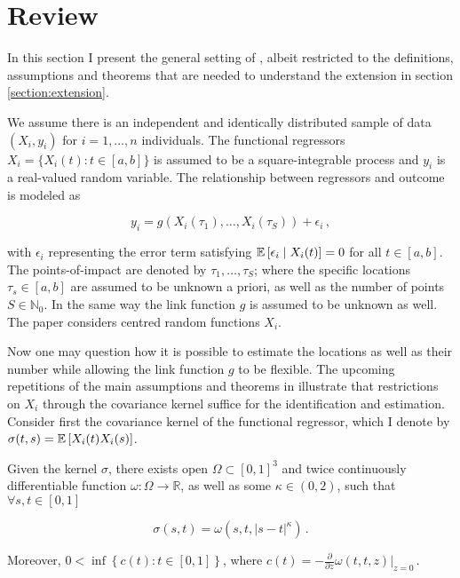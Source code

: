 \section{Review}
\label{section:review}

In this section I present the general setting of \cite{Kneip2020}, albeit restricted to
the definitions, assumptions and theorems that are needed to understand the extension in
section \ref{section:extension}.

We assume there is an independent and identically distributed sample of data $(X_i,
y_i)$ for $i=1,\dots,n$ individuals. The functional regressors $X_i = \{ X_i(t) : t \in
[a, b] \}$ is assumed to be a square-integrable process and $y_i$ is a real-valued
random variable. The relationship between regressors and outcome is modeled as

\[
    y_i = g \left( X_i(\tau_1), \dots, X_i(\tau_S) \right) + \epsilon_i \,,
\]

with $\epsilon_i$ representing the error term satisfying $\mathbb{E}\left[\epsilon_i \mid
X_i(t)\right] = 0$ for all $t \in [a, b]$. The points-of-impact are denoted by $\tau_1, \dots,
\tau_S$; where the specific locations $\tau_s \in [a, b]$ are assumed to be unknown a
priori, as well as the number of points $S \in \mathbb{N}_0$. In the same way the link
function $g$ is assumed to be unknown as well. The paper considers centred random
functions $X_i$.

Now one may question how it is possible to estimate the locations as well as their
number while allowing the link function $g$ to be flexible. The upcoming repetitions of
the main assumptions and theorems in \cite{Kneip2020} illustrate that restrictions on
$X_i$ through the covariance kernel suffice for the identification and estimation.
Consider first the covariance kernel of the functional regressor, which I denote by
$\sigma(t, s) = \mathbb{E}\left[X_i(t) X_i(s)\right]$.


\begin{assumption}
    Given the kernel $\sigma$, there exists open $\Omega \subset [0, 1]^3$ and twice
    continuously differentiable function $\omega : \Omega \to \mathbb{R}$, as well as
    some $\kappa \in (0, 2)$, such that $\forall s, t \in [0, 1]$

    \[
        \sigma(s, t) = \omega(s, t, |s-t|^{\kappa}) \,.
    \]

    Moreover, $0 < \inf \left\{ c(t) : t \in [0, 1] \right\}$, where $c(t) =
    -\frac{\partial}{\partial z} \omega(t, t, z)|_{z = 0} \,.$
\label{assumption:1}
\end{assumption}

